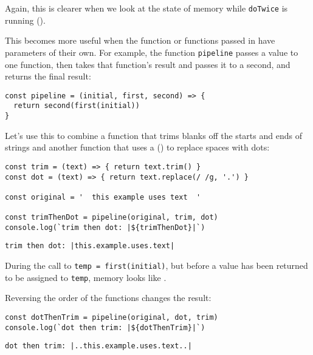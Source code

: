Again,
this is clearer when we look at the state of memory while \texttt{doTwice} is running
().


This becomes more useful when the function or functions passed in have parameters of their own.
For example,
the function \texttt{pipeline} passes a value to one function,
then takes that function's result and passes it to a second,
and returns the final result:

\begin{verbatim}
const pipeline = (initial, first, second) => {
  return second(first(initial))
}
\end{verbatim}

Let's use this to combine
a function that trims blanks off the starts and ends of strings
and another function that uses a  ()
to replace spaces with dots:

\begin{verbatim}
const trim = (text) => { return text.trim() }
const dot = (text) => { return text.replace(/ /g, '.') }

const original = '  this example uses text  '

const trimThenDot = pipeline(original, trim, dot)
console.log(`trim then dot: |${trimThenDot}|`)
\end{verbatim}

\begin{verbatim}
trim then dot: |this.example.uses.text|
\end{verbatim}

During the call to \texttt{temp\ =\ first(initial)},
but before a value has been returned to be assigned to \texttt{temp},
memory looks like .


Reversing the order of the functions changes the result:

\begin{verbatim}
const dotThenTrim = pipeline(original, dot, trim)
console.log(`dot then trim: |${dotThenTrim}|`)
\end{verbatim}

\begin{verbatim}
dot then trim: |..this.example.uses.text..|
\end{verbatim}

